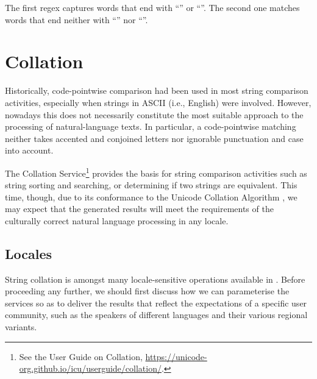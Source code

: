 \documentclass[nojss]{jss}\usepackage[]{graphicx}\usepackage[]{xcolor}
\begin{document}
The first regex captures words that end with ``\code{,}'' or ``''.
The second one matches words that end neither with ``\code{,}'' nor ``''.






\section{Collation}\label{Sec:collator}



Historically, code-pointwise comparison had been used in most string comparison
activities, especially when strings in ASCII (i.e., English) were
involved. However, nowadays %
this does not necessarily constitute the most suitable
approach to the processing of natural-language texts.
In particular, a code-pointwise matching
neither takes accented and conjoined letters nor ignorable punctuation and case
into account.



The  Collation Service\footnote{See the  User Guide on {Collation},
\url{https://unicode-org.github.io/icu/userguide/collation/}.}
provides the basis for string comparison activities  such as
string sorting and searching, or determining if two strings are equivalent.
This time, though, due to its conformance to
the Unicode Collation Algorithm \citep{uts10:collation},
we may expect that the generated results
will meet the requirements of the culturally correct
natural language processing in any locale.





\subsection{Locales}

String collation is amongst many locale-sensitive operations  available
in . Before proceeding any further, we should
first discuss how we can parameterise the  services
so as to deliver the results that reflect the expectations
of a specific user community, such as the speakers of different languages
and their various regional variants.
\end{document}
